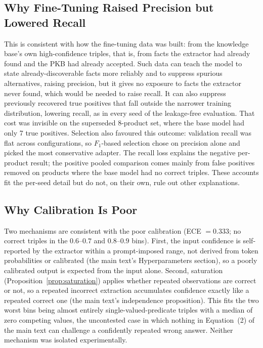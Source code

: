 \documentclass[11pt]{article}
\begin{document}
\subsection{Why Fine-Tuning Raised Precision but Lowered Recall}
\label{sec:discussion-finetuning}

This is consistent with how the fine-tuning data was built: from the
knowledge base's own high-confidence triples, that is, from facts the
extractor had already found and the PKB had already accepted. Such data
can teach the model to state already-discoverable facts more reliably
and to suppress spurious alternatives, raising precision, but it gives no
exposure to facts the extractor never found, which would be needed to
raise recall. It can also suppress previously recovered true positives
that fall outside the narrower training distribution, lowering recall,
as in every seed of the leakage-free evaluation. That cost was invisible
on the superseded 8-product set, where the base model had only 7 true
positives. Selection also favoured this outcome: validation recall was
flat across configurations, so $F_1$-based selection chose on precision
alone and picked the most conservative adapter. The recall loss explains
the negative per-product result; the positive pooled comparison comes
mainly from false positives removed on products where the base model had
no correct triples. These accounts fit the per-seed detail but do not, on
their own, rule out other explanations.

\subsection{Why Calibration Is Poor}
\label{sec:discussion-calibration}

Two mechanisms are consistent with the poor calibration (ECE $=0.333$;
no correct triples in the $0.6$--$0.7$ and $0.8$--$0.9$ bins). First, the
input confidence is self-reported by the extractor within a
prompt-imposed range, not derived from token probabilities or calibrated
(the main text's Hyperparameters section), so a poorly calibrated output
is expected from the input alone. Second, saturation
(Proposition~\ref{prop:saturation}) applies whether repeated
observations are correct or not, so a repeated incorrect extraction
accumulates confidence exactly like a repeated correct one
(the main text's independence proposition). This fits the two worst bins being
almost entirely single-valued-predicate triples with a median of zero
competing values, the uncontested case in which nothing in
Equation~(2) of the main text can challenge a confidently repeated wrong
answer. Neither mechanism was isolated experimentally.
\end{document}
